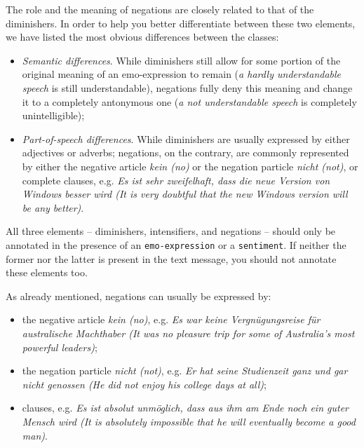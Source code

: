 \documentclass[11pt,a4paper]{article}
\begin{document}
The role and the meaning of negations are closely related to that of
the diminishers.  In order to help you better differentiate between
these two elements, we have listed the most obvious differences
between the classes:
\begin{itemize}
  \item\textit{Semantic differences}.  While diminishers still allow
    for some portion of the original meaning of an emo-expression to
    remain (\textit{a hardly understandable speech} is still
    understandable), negations fully deny this meaning and change it
    to a completely antonymous one (\textit{a not understandable
      speech} is completely unintelligible);

  \item\textit{Part-of-speech differences}.  While diminishers are usually
    expressed by either adjectives or adverbs; negations, on the contrary, are
    commonly represented by either the negative article \textit{kein (no)} or
    the negation particle \textit{nicht (not)}, or complete clauses, e.g.
    \textit{Es ist sehr zweifelhaft, dass die neue Version von Windows besser
      wird (It is very doubtful that the new Windows version will be any
      better)}.

\end{itemize}
All three elements -- diminishers, intensifiers, and negations --
should only be annotated in the presence of an \texttt{emo-expression}
or a \texttt{sentiment}.  If neither the former nor the latter is
present in the text message, you should not annotate these elements
too.

As already mentioned, negations can usually be expressed by:
\begin{itemize}
  \item the negative article \textit{kein (no)}, e.g. \textit{Es war keine
    Vergn\"ugungsreise f\"ur australische Machthaber (It was no pleasure trip
    for some of Australia's most powerful leaders)};
  \item the negation particle \textit{nicht (not)}, e.g. \textit{Er hat seine
    Studienzeit ganz und gar nicht genossen (He did not enjoy his college days
    at all)};
  \item clauses, e.g. \textit{Es ist absolut unm\"oglich, dass aus ihm am Ende
    noch ein guter Mensch wird (It is absolutely impossible that he will
    eventually become a good man)}.
\end{itemize}
\end{document}
